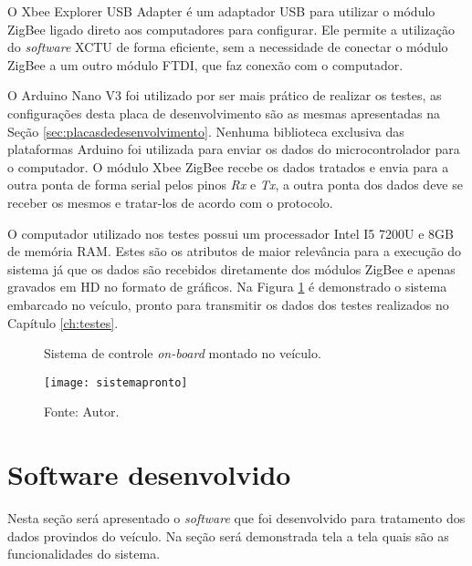 O Xbee Explorer USB Adapter\cite{explorer} é um adaptador USB para utilizar o módulo ZigBee ligado direto aos computadores para configurar. Ele permite a utilização do \textit{software} XCTU de forma eficiente, sem a necessidade de conectar o módulo ZigBee a um outro módulo FTDI\cite{ftdi}, que faz conexão com o computador. 

O Arduino Nano V3 foi utilizado por ser mais prático de realizar os testes, as configurações desta placa de desenvolvimento são as mesmas apresentadas na Seção \ref{sec:placasdedesenvolvimento}. Nenhuma biblioteca exclusiva das plataformas Arduino foi utilizada para enviar os dados do microcontrolador para o computador. O módulo Xbee ZigBee recebe os dados tratados e envia para a outra ponta de forma serial pelos pinos \textit{Rx} e \textit{Tx}, a outra ponta dos dados deve se receber os mesmos e tratar-los de acordo com o protocolo.

O computador utilizado nos testes possui um processador Intel I5 7200U e 8GB de memória RAM. Estes são os atributos de maior relevância para a execução do sistema já que os dados são recebidos diretamente dos módulos ZigBee e apenas gravados em HD no formato de gráficos. Na Figura \ref{fig:sistemapronto} é demonstrado o sistema embarcado no veículo, pronto para transmitir os dados dos testes realizados no Capítulo \ref{ch:testes}. 

\begin{figure}[!htb]
	\centering
		\caption{Sistema de controle \textit{on-board} montado no veículo.}
		\texttt{[image: sistemapronto]} 
		\caption*{Fonte: Autor.}
		\label{fig:sistemapronto}
\end{figure}    


\section {Software desenvolvido}
Nesta seção será apresentado o \textit{software} que foi desenvolvido para tratamento dos dados provindos do veículo. Na seção será demonstrada tela a tela quais são as funcionalidades do sistema.

